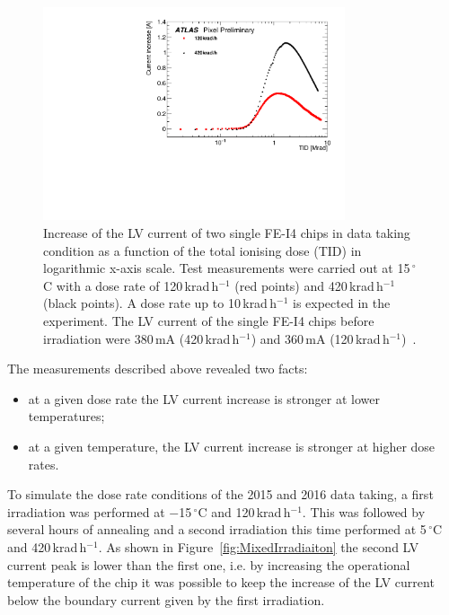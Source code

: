 \begin{figure}[h!]
\centering
\includegraphics[width=3.5in]{figures/ElectronicsChapter/ATLAS/DoserateComparison.pdf}
\caption{Increase of the LV current  of two single FE-I4 chips in data taking condition as a function of the total ionising dose (TID) in logarithmic x-axis scale. Test measurements were carried out at 15\,$^\circ$C with a dose rate of 120\,krad\,h$^{-1}$ (red points) and 420\,krad\,h$^{-1}$ (black points). A dose rate up to 10\,krad\,h$^{-1}$ is expected in the experiment. The LV current of the single FE-I4 chips before irradiation were 380\,mA (420\,krad\,h$^{-1}$) and 360\,mA (120\,krad\,h$^{-1}$)~\cite{TaskForceNote}.}
\label{fig:DoserateComparison}
\end{figure} 
%
The measurements described above revealed two facts: 
\begin{itemize} 
\item at a given dose rate the LV current increase is stronger at lower temperatures; 
\item at a given temperature, the LV current increase is stronger at higher dose rates.
\end{itemize}
To simulate the dose rate conditions of the 2015 and 2016 data taking, a first irradiation was performed at $-$15\,$^\circ$C and 120\,krad\,h$^{-1}$. This was followed by several hours of annealing and a second irradiation this time performed at 5\,$^\circ$C and 420\,krad\,h$^{-1}$.
As shown in Figure~\ref{fig:MixedIrradiaiton} the second LV current peak is lower than the first one, i.e. by increasing the operational temperature of the chip it was possible to keep the increase of the LV current below the boundary current given by the first irradiation. 
%
